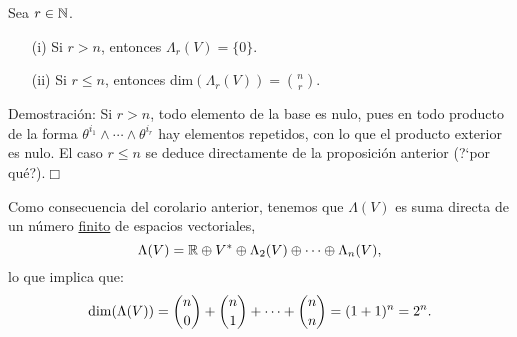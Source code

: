 \documentclass[cursovd_portada.tex]{subfiles}
\begin{document}
\newpage

\begin{coroap}
Sea $r\in\mathbb{N}$.
\begin{enumerate}
\item[(i)] Si $r>n$, entonces $\Lambda_r(V)=\{0\}$.
\item[(ii)] Si $r\leq n$, entonces dim$(\Lambda_r(V))={n\choose r}$.
\end{enumerate}
\end{coroap}
{\sc Demostración:} Si $r>n$, todo elemento de la base es nulo, pues en todo producto de la forma
$\theta^{i_1}\wedge\cdots\wedge\theta^{i_r}$ hay elementos repetidos, con lo que el producto exterior es nulo. El
caso $r\leq n$ se deduce directamente de la proposición anterior (?`por qué?).\hfill$\Box$
\par
Como consecuencia del corolario anterior, tenemos que $\Lambda (V)$ es suma directa de un número
\underline{finito} de espacios vectoriales,
$$\Lambda(V)=\mathbb{R}\oplus V^*\oplus\Lambda_2(V)\oplus\cdots\oplus\Lambda_n(V),$$
lo que implica que:
$${\rm dim}(\Lambda(V))={n\choose 0}+{n\choose 1}+\cdots+{n\choose n}=(1+1)^n
=2^n.$$
\end{document}
